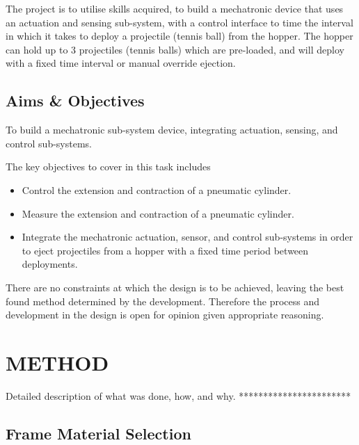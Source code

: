 \documentclass[a4paper, 10pt]{IEEEconf}
\begin{document}
The project is to utilise skills acquired, to build a mechatronic device that uses an actuation and sensing sub-system, with a control interface to time the interval in which it takes to deploy a projectile (tennis ball) from the hopper. The hopper can hold up to 3 projectiles (tennis balls) which are pre-loaded, and will deploy with a fixed time interval or manual override ejection.


\subsection{Aims \& Objectives}

To build a mechatronic sub-system device, integrating actuation, sensing, and control sub-systems.

The key objectives to cover in this task includes

\begin{itemize}
	\item Control the extension and contraction of a pneumatic cylinder.
	\item Measure the extension and contraction of a pneumatic cylinder.
	\item Integrate the mechatronic actuation, sensor, and control sub-systems in order to eject projectiles from a hopper with a fixed time period between deployments.
\end{itemize}

There are no constraints at which the design is to be achieved, leaving the best found method determined by the development. Therefore the process and development in the design is open for opinion given appropriate reasoning.


\section{METHOD}

Detailed description of what was done, how, and why. 
***********************


\subsection{Frame Material Selection}
\end{document}
